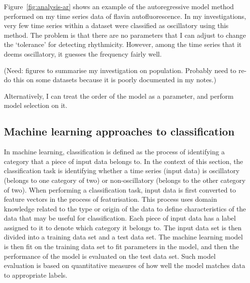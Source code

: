 Figure~\ref{fig:analysis-ar} shows an example of the autoregressive model method performed on my time series data of flavin autofluorescence.
In my investigations, very few time series within a dataset were classified as oscillatory using this method.
The problem is that there are no parameters that I can adjust to change the `tolerance' for detecting rhythmicity.
However, among the time series that it deems oscillatory, it guesses the frequency fairly well.

(Need: figures to summarise my investigation on population.  Probably need to re-do this on some datasets because it is poorly documented in my notes.)

Alternatively, I can treat the order of the model as a parameter, and perform model selection on it.

\subsection{Machine learning approaches to classification}
\label{subsec:analysis-classification-ml}



In machine learning, classification is defined as the process of identifying a category that a piece of input data belongs to.
In the context of this section, the classification task is identifying whether a time series (input data) is oscillatory (belongs to one category of two) or non-oscillatory (belongs to the other category of two).
When performing a classification task, input data is first converted to feature vectors in the process of featurisation.
This process uses domain knowledge related to the type or origin of the data to define characteristics of the data that may be useful for classification.
Each piece of input data has a label assigned to it to denote which category it belongs to.
The input data set is then divided into a training data set and a test data set.
The machine learning model is then fit on the training data set to fit parameters in the model, and then the performance of the model is evaluated on the test data set.
Such model evaluation is based on quantitative measures of how well the model matches data to appropriate labels.


